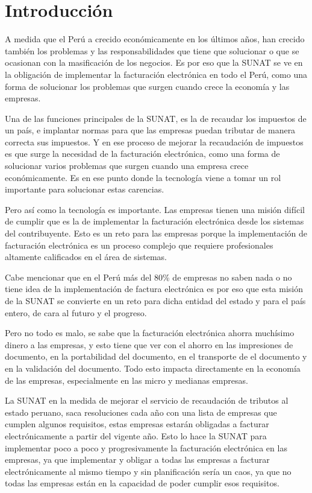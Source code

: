 \chapter*{Introducción}
A medida que el Perú a crecido económicamente en los últimos años, han crecido también los problemas y las responsabilidades que tiene que solucionar o que se ocasionan con la masificación de los negocios. Es por eso que la SUNAT se ve en la obligación de implementar la facturación electrónica en todo el Perú, como una forma de solucionar los problemas que surgen cuando crece la economía y las empresas.

Una de las funciones principales de la SUNAT, es la de recaudar los impuestos de un país, e implantar normas para que las empresas puedan tributar de manera correcta sus impuestos. Y en ese proceso de mejorar la recaudación de impuestos es que surge la necesidad de la facturación electrónica, como una forma de solucionar varios problemas que surgen cuando una empresa crece económicamente. Es en ese punto donde la tecnología viene a tomar un rol importante para solucionar estas carencias.

Pero así como la tecnología es importante. Las empresas tienen una misión difícil de cumplir que es la de implementar la facturación electrónica desde los sistemas del contribuyente. Esto es un reto para las empresas porque la implementación de facturación electrónica es un proceso complejo que requiere profesionales altamente calificados en el área de sistemas. 

Cabe mencionar que en el Perú más del 80\% de empresas no saben nada o no tiene idea de la implementación de factura electrónica es por eso que esta misión de la SUNAT se convierte en un reto para dicha entidad del estado y para el país entero, de cara al futuro y el progreso. 

Pero no todo es malo, se sabe que la facturación electrónica ahorra muchísimo dinero a las empresas, y esto tiene que ver con el ahorro en las impresiones de documento, en la portabilidad del documento, en el transporte de el documento y en la validación del documento. Todo esto impacta directamente en la economía de las empresas, especialmente en las micro y medianas empresas.

La SUNAT en la medida de mejorar el servicio de recaudación de tributos al estado peruano, saca resoluciones cada año con una lista de empresas que cumplen algunos requisitos, estas empresas estarán obligadas a facturar electrónicamente a partir del vigente año. Esto lo hace la SUNAT para implementar poco a poco y progresivamente la facturación electrónica en las empresas, ya que implementar y obligar a todas las empresas a facturar electrónicamente al mismo tiempo y sin planificación sería un caos, ya que no todas las empresas están en la capacidad de poder cumplir esos requisitos.

